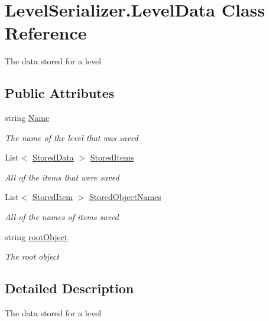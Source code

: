 \hypertarget{class_level_serializer_1_1_level_data}{}\section{Level\+Serializer.\+Level\+Data Class Reference}
\label{class_level_serializer_1_1_level_data}


The data stored for a level  


\subsection*{Public Attributes}
\begin{DoxyCompactItemize}
\item 
string \hyperlink{class_level_serializer_1_1_level_data_a48a7e96d392fff3d3060654c329c4cda}{Name}
\begin{DoxyCompactList}\small\item\em The name of the level that was saved \end{DoxyCompactList}\item 
List$<$ \hyperlink{class_level_serializer_1_1_stored_data}{Stored\+Data} $>$ \hyperlink{class_level_serializer_1_1_level_data_abcbeea8b0c4fa1b1d58ef82c3440e18d}{Stored\+Items}
\begin{DoxyCompactList}\small\item\em All of the items that were saved \end{DoxyCompactList}\item 
List$<$ \hyperlink{class_level_serializer_1_1_stored_item}{Stored\+Item} $>$ \hyperlink{class_level_serializer_1_1_level_data_a9856376db0262a37e33f3c37ff90dcc9}{Stored\+Object\+Names}
\begin{DoxyCompactList}\small\item\em All of the names of items saved \end{DoxyCompactList}\item 
string \hyperlink{class_level_serializer_1_1_level_data_a0b96560392b6a45eb43952bfb7c09a83}{root\+Object}
\begin{DoxyCompactList}\small\item\em The root object \end{DoxyCompactList}\end{DoxyCompactItemize}


\subsection{Detailed Description}
The data stored for a level 



